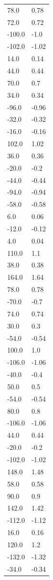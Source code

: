 \begin{longtable}{ll}
78.0 & 0.78 \\
72.0 & 0.72 \\
-100.0 & -1.0 \\
-102.0 & -1.02 \\
14.0 & 0.14 \\
44.0 & 0.44 \\
70.0 & 0.7 \\
34.0 & 0.34 \\
-96.0 & -0.96 \\
-32.0 & -0.32 \\
-16.0 & -0.16 \\
102.0 & 1.02 \\
36.0 & 0.36 \\
-20.0 & -0.2 \\
-44.0 & -0.44 \\
-94.0 & -0.94 \\
-58.0 & -0.58 \\
6.0 & 0.06 \\
-12.0 & -0.12 \\
4.0 & 0.04 \\
110.0 & 1.1 \\
38.0 & 0.38 \\
164.0 & 1.64 \\
78.0 & 0.78 \\
-70.0 & -0.7 \\
74.0 & 0.74 \\
30.0 & 0.3 \\
-54.0 & -0.54 \\
100.0 & 1.0 \\
-106.0 & -1.06 \\
-40.0 & -0.4 \\
50.0 & 0.5 \\
-54.0 & -0.54 \\
80.0 & 0.8 \\
-106.0 & -1.06 \\
44.0 & 0.44 \\
-20.0 & -0.2 \\
-102.0 & -1.02 \\
148.0 & 1.48 \\
58.0 & 0.58 \\
90.0 & 0.9 \\
142.0 & 1.42 \\
-112.0 & -1.12 \\
16.0 & 0.16 \\
120.0 & 1.2 \\
-132.0 & -1.32 \\
-34.0 & -0.34 \\

\end{longtable}
